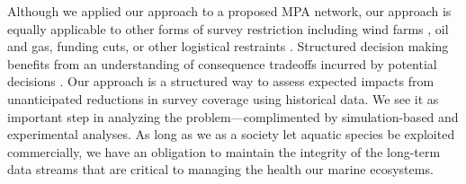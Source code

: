 \documentclass[12pt]{article}
\begin{document}
\begin{spacing}{1.4}
Although we applied our approach to a proposed MPA network, our approach is equally applicable to other forms of survey restriction including wind farms \citep{hare2022, haase2023}, oil and gas, funding cuts, or other logistical restraints \citep{ices2023}.
Structured decision making benefits from an understanding of consequence tradeoffs incurred by potential decisions \citep{gregory2012}.
Our approach is a structured way to assess expected impacts from unanticipated reductions in survey coverage using historical data.
We see it as important step in analyzing the problem---complimented by simulation-based and experimental analyses.
As long as we as a society let aquatic species be exploited commercially, we have an obligation to maintain the integrity of the long-term data streams that are critical to managing the health our marine ecosystems.





\end{spacing}
\end{document}
